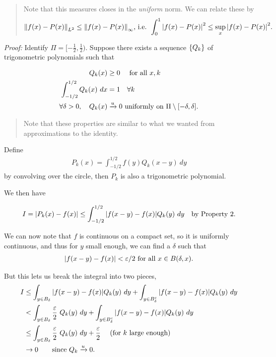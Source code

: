 \begin{quote}
Note that this measures closes in the \emph{uniform} norm. We can relate
these by
\begin{align*}
{\left\lVert {f(x) -P(x)} \right\rVert}_{L^2} \leq {\left\lVert {f(x) - P(x)} \right\rVert}_{\infty} \text{, i.e. } \int_0^1 {\left\lvert {f(x) - P(x)} \right\rvert}^2 \leq \sup_x {\left\lvert {f(x) - P(x)} \right\rvert}^2
.\end{align*}
\end{quote}

\emph{Proof:} Identify \(\Pi = [- \frac 1 2, \frac 1 2)\). Suppose there
exists a sequence \(\left\{{Q_k}\right\}\) of trigonometric polynomials such
that

\begin{align*}
Q_k(x) &\geq 0 \quad \text{ for all } x, k \\
\int_{-1/2}^{1/2} Q_k(x) ~dx &= 1 \quad \forall k \\
\forall \delta>0, \quad Q_k(x) &\xrightarrow{u} 0 \text{ uniformly on } \Pi\setminus[-\delta, \delta]
.\end{align*}

\begin{quote}
Note that these properties are similar to what we wanted from
approximations to the identity.
\end{quote}

Define
\begin{align*}
P_k(x) = \int_{-1/2}^{1/2} f(y) Q_k(x - y) ~dy
\end{align*} by convolving over the circle, then \(P_k\) is also a
trigonometric polynomial.

We then have

\begin{align*}
I = {\left\lvert { P_k(x) - f(x) } \right\rvert} \leq 
\int_{-1/2}^{1/2} {\left\lvert { f(x-y) - f(x) } \right\rvert}
Q_k(y) ~dy \quad \text{by Property 2} 
.\end{align*}

We can now note that \(f\) is continuous on a compact set, so it is
uniformly continuous, and thus for \(y\) small enough, we can find a
\(\delta\) such that
\begin{align*}
{\left\lvert {f(x-y) - f(x)} \right\rvert} < \varepsilon/2 \text{ for all } x \in B(\delta, x)
.\end{align*}

But this lets us break the integral into two pieces, \begin{align*}
I 
&\leq \int_{y \in B_\delta} {\left\lvert { f(x-y) - f(x) } \right\rvert}
Q_k(y) ~dy 
+ 
\int_{y \in B_\delta^c} {\left\lvert { f(x-y) - f(x) } \right\rvert}
Q_k(y) ~dy \\
&< \int_{y \in B_\delta} \frac \varepsilon 2~
Q_k(y) ~dy 
+
\int_{y \in B_\delta^c} {\left\lvert { f(x-y) - f(x) } \right\rvert}
Q_k(y) ~dy \\
&\leq \int_{y \in B_\delta} \frac \varepsilon 2~
Q_k(y) ~dy + \frac \varepsilon 2~ \quad \text{(for $k$ large enough)} \\
&\to 0 \quad \quad \text{since } Q_k \xrightarrow{u} 0
.\end{align*}

